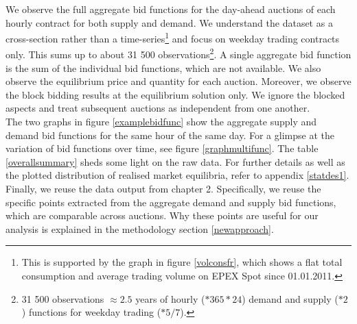 We observe the full aggregate bid functions for the day-ahead auctions of each hourly contract for both supply and demand. 
We understand the dataset as a cross-section rather than a time-series\footnote{This is supported by the graph in figure \ref{volconsfr}, which shows a flat total consumption and average trading volume on EPEX Spot since 01.01.2011.} and focus on weekday trading contracts only. 
This sums up to about 31 500 observations\footnote{31 500 observations $\approx 2.5$ years of hourly ($*365 *24$) demand and supply ($*2$) functions for weekday trading ($*5/7$).}. A single aggregate bid function is the sum of the individual bid functions, which are not available. %
We also observe the equilibrium price and quantity for each auction. Moreover, we observe the block bidding results at the equilibrium solution only. We ignore the blocked aspects and treat subsequent auctions as independent from one another.\\
	
The two graphs in figure \ref{examplebidfunc} show the aggregate supply and demand bid functions for the same hour of the same day. For a glimpse at the variation of bid functions over time, see figure \ref{graphmultifunc}. The table \ref{overallsummary} sheds some light on the raw data. For further details as well as the plotted distribution of realised market equilibria, refer to appendix \ref{statdes1}. \\

Finally, we reuse the data output from chapter 2. Specifically, we reuse the specific points extracted from the aggregate demand and supply bid functions, which are comparable across auctions. Why these points are useful for our analysis is explained in the methodology section \ref{newapproach}.

